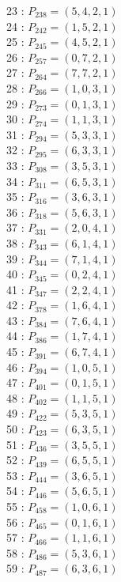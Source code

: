 \documentclass{article}
\begin{document}
{\begin{multicols}{3}
23 : $P_{238}=( 5, 4, 2, 1 )$\\
24 : $P_{242}=( 1, 5, 2, 1 )$\\
25 : $P_{245}=( 4, 5, 2, 1 )$\\
26 : $P_{257}=( 0, 7, 2, 1 )$\\
27 : $P_{264}=( 7, 7, 2, 1 )$\\
28 : $P_{266}=( 1, 0, 3, 1 )$\\
29 : $P_{273}=( 0, 1, 3, 1 )$\\
30 : $P_{274}=( 1, 1, 3, 1 )$\\
31 : $P_{294}=( 5, 3, 3, 1 )$\\
32 : $P_{295}=( 6, 3, 3, 1 )$\\
33 : $P_{308}=( 3, 5, 3, 1 )$\\
34 : $P_{311}=( 6, 5, 3, 1 )$\\
35 : $P_{316}=( 3, 6, 3, 1 )$\\
36 : $P_{318}=( 5, 6, 3, 1 )$\\
37 : $P_{331}=( 2, 0, 4, 1 )$\\
38 : $P_{343}=( 6, 1, 4, 1 )$\\
39 : $P_{344}=( 7, 1, 4, 1 )$\\
40 : $P_{345}=( 0, 2, 4, 1 )$\\
41 : $P_{347}=( 2, 2, 4, 1 )$\\
42 : $P_{378}=( 1, 6, 4, 1 )$\\
43 : $P_{384}=( 7, 6, 4, 1 )$\\
44 : $P_{386}=( 1, 7, 4, 1 )$\\
45 : $P_{391}=( 6, 7, 4, 1 )$\\
46 : $P_{394}=( 1, 0, 5, 1 )$\\
47 : $P_{401}=( 0, 1, 5, 1 )$\\
48 : $P_{402}=( 1, 1, 5, 1 )$\\
49 : $P_{422}=( 5, 3, 5, 1 )$\\
50 : $P_{423}=( 6, 3, 5, 1 )$\\
51 : $P_{436}=( 3, 5, 5, 1 )$\\
52 : $P_{439}=( 6, 5, 5, 1 )$\\
53 : $P_{444}=( 3, 6, 5, 1 )$\\
54 : $P_{446}=( 5, 6, 5, 1 )$\\
55 : $P_{458}=( 1, 0, 6, 1 )$\\
56 : $P_{465}=( 0, 1, 6, 1 )$\\
57 : $P_{466}=( 1, 1, 6, 1 )$\\
58 : $P_{486}=( 5, 3, 6, 1 )$\\
59 : $P_{487}=( 6, 3, 6, 1 )$\\

\end{multicols}}
\end{document}
